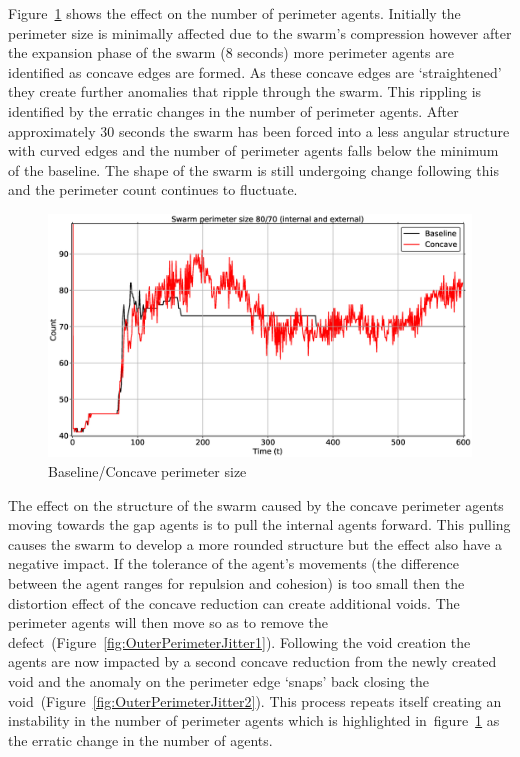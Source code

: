 Figure~\ref{concave:BaselineConcavePerimeter} shows the effect on the number of perimeter agents. Initially the perimeter size is minimally affected due to the swarm's compression however after the expansion phase of the swarm (8 seconds) more perimeter agents are identified as concave edges are formed. As these concave edges are `straightened' they create further anomalies that ripple through the swarm. This rippling is identified by the erratic changes in the number of perimeter agents. After approximately 30 seconds the swarm has been forced into a less angular structure with curved edges and the number of perimeter agents falls below the minimum of the baseline. The shape of the swarm is still undergoing change following this and the perimeter count continues to fluctuate.
\begin{figure}[H]
\begin{center}
\includegraphics[width=14cm]{CHAPTER-7/figures/BaselineConcavePerimeter}
\end{center}
\caption{Baseline/Concave perimeter size\label{concave:BaselineConcavePerimeter}}
\end{figure}

The effect on the structure of the swarm caused by the concave perimeter agents moving towards the gap agents is to pull the internal agents forward. This pulling causes the swarm to develop a more rounded structure but the effect also have a negative impact. If the tolerance of the agent's movements (the difference between the agent ranges for repulsion and cohesion) is too small then the distortion effect of the concave reduction can create additional voids. The perimeter agents will then move so as to remove the defect~(Figure~\ref{fig:OuterPerimeterJitter1}). Following the void creation the agents are now impacted by a second concave reduction from the newly created void and the anomaly on the perimeter edge `snaps' back closing the void~(Figure~\ref{fig:OuterPerimeterJitter2}). This process repeats itself creating an instability in the number of perimeter agents which is highlighted in~figure~\ref{concave:BaselineConcavePerimeter} as the erratic change in the number of agents. 

